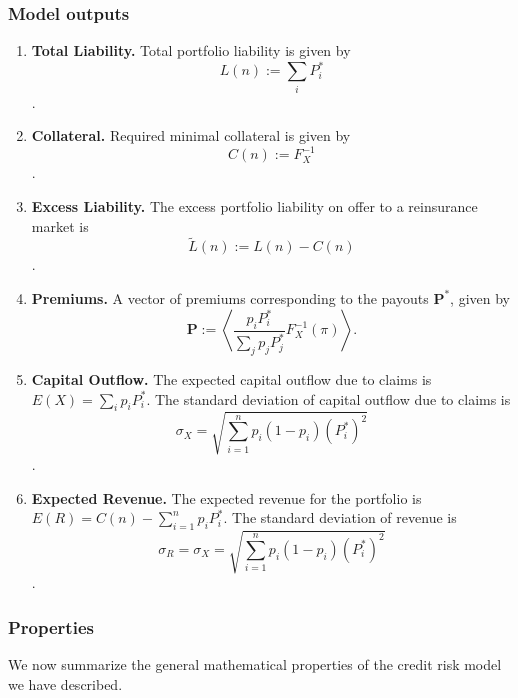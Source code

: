 \documentclass[12pt]{article}
\begin{document}
\subsubsection{Model outputs\label{outputs}}

\begin{enumerate}
    \item \textbf{Total Liability.} Total portfolio liability is given by $$L(n) := \sum_i P_i^*$$.
    \item \textbf{Collateral.} Required minimal collateral is given by $$C(n) := F_X^{-1}$$.
    \item \textbf{Excess Liability.} The excess portfolio liability on offer to a reinsurance market is $$\tilde{L}(n) := L(n) - C(n)$$.
    \item \textbf{Premiums.} A vector of premiums corresponding to the payouts $\mathbf{P^*}$, given by $$\mathbf{P}:=\left<\frac{p_iP_i^*}{\sum_j p_j P_j^* }F_X^{-1}(\pi)\right>.$$
    \item \textbf{Capital Outflow.} The expected capital outflow due to claims is $E(X)=\sum_i p_iP_i^*$. The standard deviation of capital outflow due to claims is $$\sigma_X =  \sqrt{\sum_{i=1}^np_i(1-p_i)(P_i^*)^2}$$.
    \item \textbf{Expected Revenue.} The expected revenue for the portfolio is $E(R) = C(n) - \sum_{i=1}^n p_i P_i^*$. The standard deviation of revenue is $$\sigma_R = \sigma_X = \sqrt{\sum_{i=1}^np_i(1-p_i)(P_i^*)^2}$$.
\end{enumerate}

\subsubsection{Properties}

We now summarize the general mathematical properties of the credit risk model we have described.
\end{document}
